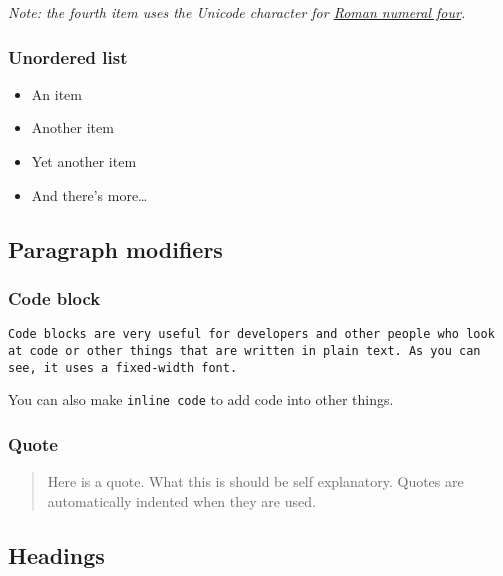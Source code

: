 \emph{Note: the fourth item uses the Unicode character for
\href{http://www.fileformat.info/info/unicode/char/2163/index.htm}{Roman
numeral four}.}

\hypertarget{unordered-list}{%
\subsubsection{Unordered list}\label{unordered-list}}

\begin{itemize}
\tightlist
\item
  An item
\item
  Another item
\item
  Yet another item
\item
  And there's more\ldots{}
\end{itemize}

\hypertarget{paragraph-modifiers}{%
\subsection{Paragraph modifiers}\label{paragraph-modifiers}}

\hypertarget{code-block}{%
\subsubsection{Code block}\label{code-block}}

\begin{verbatim}
Code blocks are very useful for developers and other people who look at code or other things that are written in plain text. As you can see, it uses a fixed-width font.
\end{verbatim}

You can also make \texttt{inline\ code} to add code into other things.

\hypertarget{quote}{%
\subsubsection{Quote}\label{quote}}

\begin{quote}
Here is a quote. What this is should be self explanatory. Quotes are
automatically indented when they are used.
\end{quote}

\hypertarget{headings}{%
\subsection{Headings}\label{headings}}

